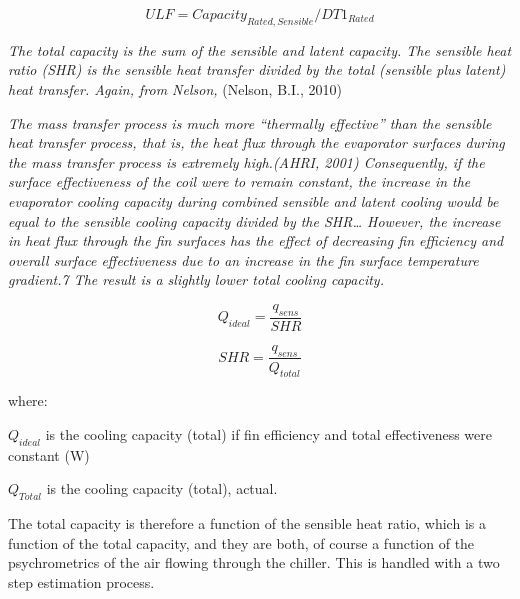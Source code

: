 \begin{equation}
ULF = Capacit{y_{Rated,Sensible}}/DT{1_{Rated}}
\end{equation}

\emph{The total capacity is the sum of the sensible and latent capacity. The sensible heat ratio (SHR) is the sensible heat transfer divided by the total (sensible plus latent) heat transfer. Again, from Nelson,} (Nelson, B.I., 2010)

\emph{The mass transfer process is much more ``thermally effective'' than the sensible heat transfer process, that is, the heat flux through the evaporator surfaces during the mass transfer process is extremely high.(AHRI, 2001) Consequently, if the surface effectiveness of the coil were to remain constant, the increase in the evaporator cooling capacity during combined sensible and latent cooling would be equal to the sensible cooling capacity divided by the SHR\ldots{} However, the increase in heat flux through the fin surfaces has the effect of decreasing fin efficiency and overall surface effectiveness due to an increase in the fin surface temperature gradient.7 The result is a slightly lower total cooling capacity.}

\begin{equation}
  Q_{ideal} = \frac{q_{sens}}{SHR}
\end{equation}

\begin{equation}
  SHR = \frac{q_{sens}}{Q_{total}}
\end{equation}

where:

\({Q_{ideal}}\) is the cooling capacity (total) if fin efficiency and total effectiveness were constant (W)

\({Q_{Total}}\) is the cooling capacity (total), actual.

The total capacity is therefore a function of the sensible heat ratio, which is a function of the total capacity, and they are both, of course a function of the psychrometrics of the air flowing through the chiller. This is handled with a two step estimation process.

